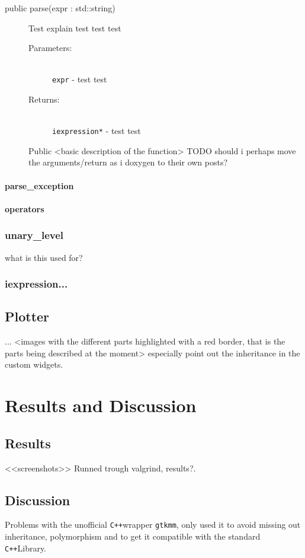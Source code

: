 \documentclass[a4paper,11pt]{kth-mag}
\newcommand{\Cpp}{\texttt{C++}}
\newcommand{\Gtkmm}{\texttt{gtkmm}}
\begin{document}
\begin{description}
    \item[public parse(expr : std::string)] 
        Test explain test test test
        \begin{description}
            \item[Parameters:]~\\
                \verb+expr+ - test test
            \item[Returns:]~\\
                \verb+iexpression*+ - test test

        \end{description}
        Public <basic description of the function> TODO should i perhaps move the arguments/return as i doxygen to their own posts?
\end{description}
\subsubsection{parse\_exception}
\subsubsection{operators}

\subsection{unary\_level}
what is this used for?
\subsection{iexpression...}

\section{Plotter}
...
<images with the different parts highlighted with a red border, that is the parts being described at the moment>
especially point out the inheritance in the custom widgets.

\chapter{Results and Discussion}

\section{Results}
<<screenshots>>
Runned trough valgrind, results?.

\section{Discussion}
Problems with the unofficial \Cpp wrapper \Gtkmm, only used it to avoid missing out inheritance, polymorphism and to get it compatible with the standard \Cpp Library. 
 
\end{document}
